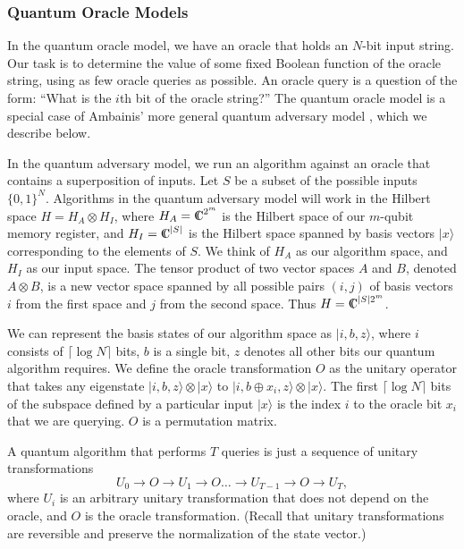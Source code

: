 \subsubsection{Quantum Oracle Models}
\label{sec:qom}

In the quantum oracle model, we have an oracle that holds an $N$-bit
input string.  Our task is to determine the value of some fixed
Boolean function of the oracle string, using as few oracle queries as
possible.  An oracle query is a question of the form: ``What is the
$i$th bit of the oracle string?''  The quantum oracle model is a
special case of Ambainis' more general quantum adversary model
\cite{ambainis00quantum}, which we describe below.

In the quantum adversary model, we run an algorithm against an oracle
that contains a superposition of inputs.  Let $S$ be a subset of the
possible inputs $\{0,1\}^{N}$.  Algorithms in the quantum adversary
model will work in the Hilbert space $H = H_{A} \otimes H_{I}$, where
$H_{A} = \Complex^{2^{m}}$ is the Hilbert space of our $m$-qubit
memory register, and $H_{I} = \Complex^{|S|}$ is the Hilbert space
spanned by basis vectors $|x\rangle$ corresponding to the elements of
$S$.  We think of $H_{A}$ as our algorithm space, and $H_{I}$ as our
input space.  The tensor product of two vector spaces $A$ and $B$,
denoted $A \otimes B$, is a new vector space spanned by all possible
pairs $(i,j)$ of basis vectors $i$ from the first space and $j$ from
the second space. Thus $H = \Complex^{|S|2^{m}}$.

We can represent the basis states of our algorithm space as $|i, b,
z\rangle$, where $i$ consists of $\lceil\log{N}\rceil$ bits, $b$ is a
single bit, $z$ denotes all other bits our quantum algorithm requires.
We define the oracle transformation $O$ as the unitary operator that
takes any eigenstate $|i,b,z\rangle \otimes |x\rangle$ to $|i, b
\oplus x_{i}, z\rangle \otimes |x\rangle$. The first 
$\lceil\log{N}\rceil$ bits of the subspace defined by a particular
input $|x\rangle$ is the index $i$ to the oracle bit $x_{i}$ that we
are querying. $O$ is a permutation matrix.

A quantum algorithm that performs $T$ queries is just a sequence of
unitary transformations
\[U_{0}\rightarrow O\rightarrow U_{1} \rightarrow O \ldots \rightarrow U_{T-1} \rightarrow O \rightarrow U_{T},\]
where $U_{i}$ is an arbitrary unitary transformation that does not
depend on the oracle, and $O$ is the oracle transformation.  (Recall
that unitary transformations are reversible and preserve the
normalization of the state vector.)


